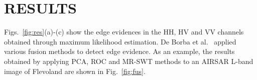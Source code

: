 \documentclass{article}
\begin{document}

\section{RESULTS}

Figs.~\ref{fig:res}(a)-(c) show the edge evidences in the HH, HV and VV channels obtained through maximum likelihood estimation.
De Borba et al.~\cite{DeBorba2020} applied various fusion methods to detect edge evidence. 
As an example, the results obtained by applying PCA, ROC and MR-SWT methods to an AIRSAR L-band image of Flevoland are shown in Fig.~\ref{fig:fus}.%
\end{document}

